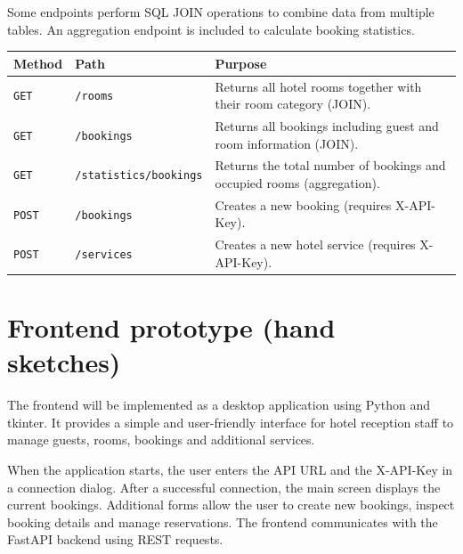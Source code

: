 \documentclass[11pt,a4paper]{article}
\begin{document}
Some endpoints perform SQL JOIN operations to combine data from multiple
tables. An aggregation endpoint is included to calculate booking statistics.

\renewcommand{\arraystretch}{1.2}

\begin{tabularx}{\linewidth}{@{}p{2cm}p{5cm}X@{}}
\toprule
\textbf{Method} & \textbf{Path} & \textbf{Purpose} \\
\midrule

\texttt{GET}
&
\texttt{/rooms}
&
Returns all hotel rooms together with their room category (JOIN). \\

\texttt{GET}
&
\texttt{/bookings}
&
Returns all bookings including guest and room information (JOIN). \\

\texttt{GET}
&
\texttt{/statistics/bookings}
&
Returns the total number of bookings and occupied rooms (aggregation). \\

\texttt{POST}
&
\texttt{/bookings}
&
Creates a new booking (requires X-API-Key). \\


\texttt{POST}
&
\texttt{/services}
&
Creates a new hotel service (requires X-API-Key). \\

\bottomrule
\end{tabularx}

\section{Frontend prototype (hand sketches)}

The frontend will be implemented as a desktop application using Python and
tkinter. It provides a simple and user-friendly interface for hotel reception
staff to manage guests, rooms, bookings and additional services.

When the application starts, the user enters the API URL and the X-API-Key in
a connection dialog. After a successful connection, the main screen displays
the current bookings. Additional forms allow the user to create new bookings,
inspect booking details and manage reservations. The frontend communicates
with the FastAPI backend using REST requests.
\end{document}
